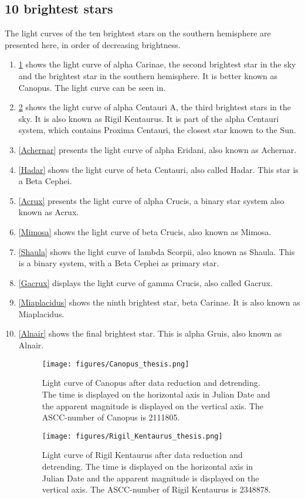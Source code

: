 \documentclass[onecolumn]{aa} %
\begin{document}
\subsection{10 brightest stars}
The light curves of the ten brightest stars on the southern hemisphere are presented here, in order of decreasing brightness. 
\begin{enumerate}
\item \ref{Canopus} shows the light curve of alpha Carinae, the second brightest star in the sky and the brightest star in the southern hemisphere. It is better known as Canopus. The light curve can be seen in.
\item \ref{Rigil_Kentaurus} shows the light curve of alpha Centauri A, the third brightest stars in the sky. It is also known as Rigil Kentaurus. It is part of the alpha Centauri system, which contains Proxima Centauri, the closest star known to the Sun. 
\item \ref{Achernar} presents the light curve of alpha Eridani, also known as Achernar.
\item \ref{Hadar} shows the light curve of beta Centauri, also called Hadar. This star is a Beta Cephei.
\item \ref{Acrux} presents the light curve of alpha Crucis, a binary star system also known as Acrux.
\item \ref{Mimosa} shows the light curve of beta Crucis, also known as Mimosa.
\item \ref{Shaula} shows the light curve of lambda Scorpii, also known as Shaula. This is a binary system, with a Beta Cephei as primary star.
\item \ref{Gacrux} displays the light curve of gamma Crucis, also called Gacrux.
\item \ref{Miaplacidus} shows the ninth brightest star, beta Carinae. It is also known as Miaplacidus.
\item \ref{Alnair} shows the final brightest star. This is alpha Gruis, also known as Alnair.

\begin{figure}
    \centering
    \texttt{[image: figures/Canopus\_thesis.png]}
    \caption{Light curve of Canopus after data reduction and detrending. The time is displayed on the horizontal axis in Julian Date and the apparent magnitude is displayed on the vertical axis. The ASCC-number of Canopus is 2111805.}
    \label{Canopus}
\end{figure}

\begin{figure}
    \centering
    \texttt{[image: figures/Rigil\_Kentaurus\_thesis.png]}
    \caption{Light curve of Rigil Kentaurus after data reduction and detrending. The time is displayed on the horizontal axis in Julian Date and the apparent magnitude is displayed on the vertical axis. The ASCC-number of Rigil Kentaurus is 2348878.}
    \label{Rigil_Kentaurus}
\end{figure}


\end{enumerate}
\end{document}
